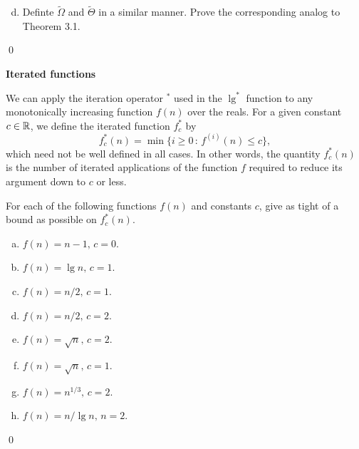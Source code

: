 \begin{enumerate}[(a)]
    \setcounter{enumi}{3}
    \item Definte $\tilde{\Omega}$ and $\tilde{\Theta}$ in a similar manner. Prove the corresponding analog to Theorem 3.1.
\end{enumerate}

\sol \qed

 \textbf{Iterated functions}

We can apply the iteration operator $^*$ used in the $\lg^*$ function to any monotonically increasing function $f(n)$ over the reals. For a given constant $c \in \mathbb{R}$, we define the iterated function $f_c^*$ by $$f_c^*(n) = \min\{i \geq 0 \, : \, f^{(i)}(n) \leq c\},$$ which need not be well defined in all cases. In other words, the quantity $f_c^*(n)$ is the number of iterated applications of the function $f$ required to reduce its argument down to $c$ or less.

For each of the following functions $f(n)$ and constants $c$, give as tight of a bound as possible on $f_c^*(n).$

\begin{enumerate}[(a)]
    \item $f(n) = n-1, \, c=0$.
    \item $f(n) = \lg n, \, c=1$.
    \item $f(n) = n/2, \, c=1$.
    \item $f(n) = n/2, \, c=2$.
    \item $f(n) = \sqrt{n}, \, c=2$.
    \item $f(n) = \sqrt{n}, \, c=1$.
    \item $f(n) = n^{1/3}, \, c=2$.
    \item $f(n) = n/\lg n, \, n=2$.
\end{enumerate}

\sol \qed